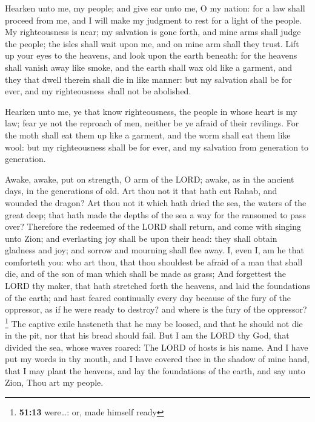  Hearken unto me, my people; and give ear unto me, O my
nation: for a law shall proceed from me, and I will make my judgment to
rest for a light of the people.  My righteousness is near;
my salvation is gone forth, and mine arms shall judge the people; the
isles shall wait upon me, and on mine arm shall they trust.
 Lift up your eyes to the heavens, and look upon the earth
beneath: for the heavens shall vanish away like smoke, and the earth
shall wax old like a garment, and they that dwell therein shall die in
like manner: but my salvation shall be for ever, and my righteousness
shall not be abolished.

 Hearken unto me, ye that know righteousness, the people
in whose heart is my law; fear ye not the reproach of men, neither be ye
afraid of their revilings.  For the moth shall eat them up
like a garment, and the worm shall eat them like wool: but my
righteousness shall be for ever, and my salvation from generation to
generation.

 Awake, awake, put on strength, O arm of the LORD; awake,
as in the ancient days, in the generations of old. Art thou not it that
hath cut Rahab, and wounded the dragon?  Art thou not it
which hath dried the sea, the waters of the great deep; that hath made
the depths of the sea a way for the ransomed to pass over?
 Therefore the redeemed of the LORD shall return, and
come with singing unto Zion; and everlasting joy shall be upon their
head: they shall obtain gladness and joy; and sorrow and mourning shall
flee away.  I, even I, am he that comforteth you: who art
thou, that thou shouldest be afraid of a man that shall die, and of the
son of man which shall be made as grass;  And forgettest
the LORD thy maker, that hath stretched forth the heavens, and laid the
foundations of the earth; and hast feared continually every day because
of the fury of the oppressor, as if he were ready to destroy? and where
is the fury of the oppressor?\footnote{\textbf{51:13} were\ldots: or,
  made himself ready}  The captive exile hasteneth that
he may be loosed, and that he should not die in the pit, nor that his
bread should fail.  But I am the LORD thy God, that
divided the sea, whose waves roared: The LORD of hosts is his name.
 And I have put my words in thy mouth, and I have covered
thee in the shadow of mine hand, that I may plant the heavens, and lay
the foundations of the earth, and say unto Zion, Thou art my people.

